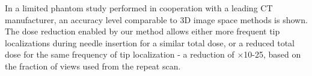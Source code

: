 In a limited phantom study performed in cooperation with a leading CT manufacturer, an accuracy level comparable to 3D image space methods is shown.
The dose reduction enabled by our method allows either more frequent tip localizations during needle insertion for a similar total dose, or a reduced total dose for the same frequency of tip localization - a reduction of $\times$10-25, based on the fraction of views used from the repeat scan.








